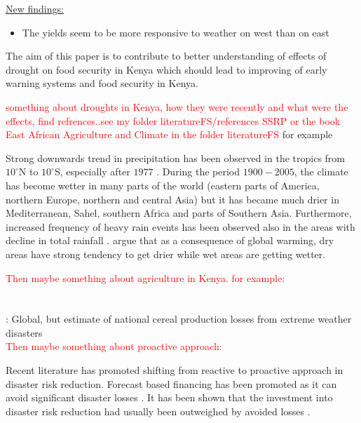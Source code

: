 \documentclass[a4paper,12pt]{article}
\begin{document}
\underline{New findings:}

\begin{itemize}
\item The yields seem to be more responsive to weather on west than on east
\end{itemize}
\normalsize
\FloatBarrier
\pagebreak
The aim of this paper is to contribute to better understanding of effects of drought on food security in Kenya which should lead to improving of early warning systems and food security in Kenya.



\textcolor{red}{something about droughts in Kenya, how they were recently and what were the effects, find refrences..see my folder literatureFS/references SSRP or the book East African Agriculture and Climate in the folder literatureFS} for example \citep{Nicholson2017}

Strong downwards trend in precipitation has been observed in the tropics from $10^\circ$N to $10^\circ$S, especially after $1977$ \citep{IPCCtrenberth}. During the period $1900-2005$, the climate has become wetter in many parts of the world (eastern parts of America, northern Europe, northern and central Asia) but it has became much drier in Mediterranean, Sahel, southern Africa and parts of Southern Asia. Furthermore, increased frequency of heavy rain events has been observed also in the areas with decline in total rainfall \citep{IPCCtrenberth}. \cite{Trenberth2014} argue that as a consequence of global warming, dry areas have strong tendency to get drier while wet areas are getting wetter. 
 
\textcolor{red}{Then maybe something about agriculture in Kenya. for example:}
 \\
 \cite{Kabubo2015} \\
 \cite{WorldBank2015} \\
  \cite{Lesk2016}: Global, but estimate of national cereal production losses from extreme weather disasters
 \\
 
\textcolor{red}{Then maybe something about proactive approach:}
  
Recent literature has promoted shifting from reactive to proactive approach in disaster risk reduction. Forecast based financing has been promoted as it can avoid significant disaster losses \citep{Nicholson2017}. It has been shown that the investment into disaster risk reduction had usually been outweighed by avoided losses \citep{Mechler2005}. 
  
\end{document}
